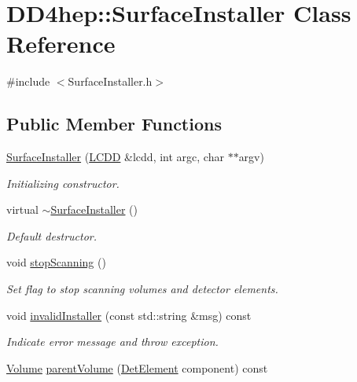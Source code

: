 \hypertarget{class_d_d4hep_1_1_surface_installer}{
\section{DD4hep::SurfaceInstaller Class Reference}
\label{class_d_d4hep_1_1_surface_installer}
}


{\ttfamily \#include $<$SurfaceInstaller.h$>$}\subsection*{Public Member Functions}
\begin{DoxyCompactItemize}
\item 
\hyperlink{class_d_d4hep_1_1_surface_installer_a3d66822b1627a31f133d29f0c330b82c}{SurfaceInstaller} (\hyperlink{class_d_d4hep_1_1_geometry_1_1_l_c_d_d}{LCDD} \&lcdd, int argc, char $\ast$$\ast$argv)
\begin{DoxyCompactList}\small\item\em Initializing constructor. \item\end{DoxyCompactList}\item 
virtual \hyperlink{class_d_d4hep_1_1_surface_installer_a4fa5c2ba032d20b735556b8e90aacfdb}{$\sim$SurfaceInstaller} ()
\begin{DoxyCompactList}\small\item\em Default destructor. \item\end{DoxyCompactList}\item 
void \hyperlink{class_d_d4hep_1_1_surface_installer_a57fe4482c0759fc874a4248c0f4d89d8}{stopScanning} ()
\begin{DoxyCompactList}\small\item\em Set flag to stop scanning volumes and detector elements. \item\end{DoxyCompactList}\item 
void \hyperlink{class_d_d4hep_1_1_surface_installer_a28890bdc758b65cf6224680631988d06}{invalidInstaller} (const std::string \&msg) const 
\begin{DoxyCompactList}\small\item\em Indicate error message and throw exception. \item\end{DoxyCompactList}\item 
\hyperlink{class_d_d4hep_1_1_geometry_1_1_volume}{Volume} \hyperlink{class_d_d4hep_1_1_surface_installer_a18aa921877964baf2b272bd0e80d4b8e}{parentVolume} (\hyperlink{class_d_d4hep_1_1_geometry_1_1_det_element}{DetElement} component) const 
$$
\end{DoxyCompactItemize}

